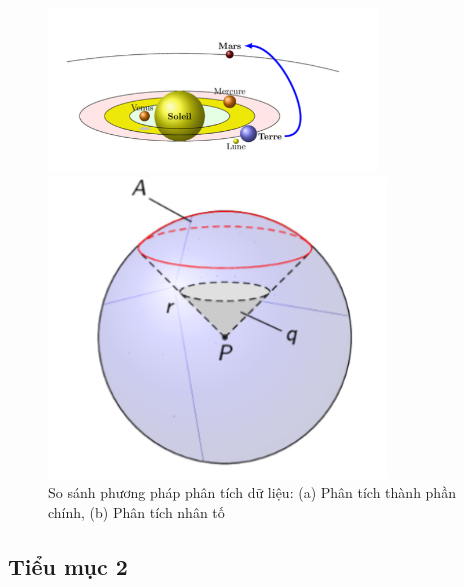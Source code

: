 
\begin{figure}[h]
    \centering
    \begin{minipage}{0.45\textwidth}
        \centering
        \includegraphics[width=\textwidth]{../../assets/images/figure-2.png}
    \end{minipage}
    \hfill
    \begin{minipage}{0.45\textwidth}
        \centering
        \includegraphics[width=0.8\textwidth]{../../assets/images/figure-3.png}
    \end{minipage}
    \caption{So sánh phương pháp phân tích dữ liệu: (a) Phân tích thành phần chính, (b) Phân tích nhân tố}
    \label{fig:comparison_analysis_methods}
\end{figure}
\subsection{Tiểu mục 2}

